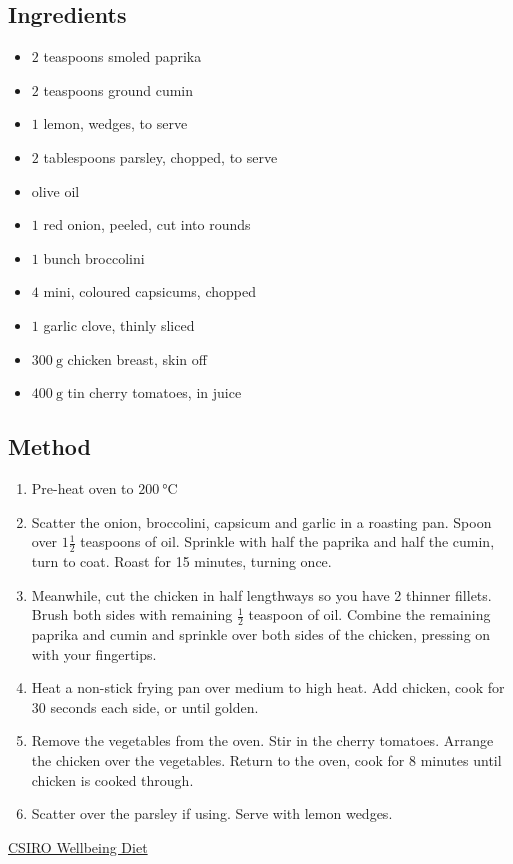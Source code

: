 \documentclass[11pt,a4paper]{article}
\begin{document}
\subsection*{Ingredients}

\begin{multicols}{2}

\begin{itemize}
  \item $ 2 $ teaspoons smoled paprika
  \item $ 2 $ teaspoons ground cumin
  \item $ 1 $ lemon, wedges, to serve
  \item $ 2 $ tablespoons parsley, chopped, to serve
  \item olive oil
\end{itemize}

\columnbreak

\begin{itemize}
  \item $ 1 $ red onion, peeled, cut into rounds
  \item $ 1 $ bunch broccolini
  \item $ 4 $ mini, coloured capsicums, chopped
  \item $ 1 $ garlic clove, thinly sliced
  \item $ \qty{300}{\gram} $ chicken breast, skin off
  \item $ \qty{400}{\gram} $ tin cherry tomatoes, in juice
\end{itemize}

\end{multicols}

\medskip

\subsection*{Method}

\begin{enumerate}
  \item Pre-heat oven to $ \qty{200}{\celsius} $
  \item Scatter the onion, broccolini, capsicum and garlic in a roasting pan. Spoon over $ 1 \frac {1}{2} $ teaspoons of oil. Sprinkle with half the paprika and half the cumin, turn to coat. Roast for 15 minutes, turning once.
  \item Meanwhile, cut the chicken in half lengthways so you have 2 thinner fillets. Brush both sides with remaining $ \frac{1}{2} $ teaspoon of oil. Combine the remaining paprika and cumin and sprinkle over both sides of the chicken, pressing on with your fingertips.
  \item Heat a non-stick frying pan over medium to high heat. Add chicken, cook for 30 seconds each side, or until golden.
  \item Remove the vegetables from the oven. Stir in the cherry tomatoes. Arrange the chicken over the vegetables. Return to the oven, cook for 8 minutes until chicken is cooked through.
  \item Scatter over the parsley if using. Serve with lemon wedges.
\end{enumerate}

\href{https://www.totalwellbeingdiet.com/au/recipes/quick-easy-recipes/spanish-style-chicken-vegetable-tray-bake/}{CSIRO Wellbeing Diet}
\end{document}

